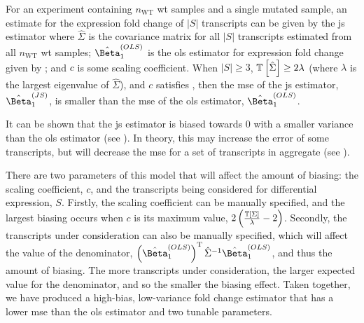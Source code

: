 \begin{theorem}
  For an experiment containing $n_\mathrm{WT}$ \gls{wt} samples and a single mutated sample, an estimate for the expression fold change of $|S|$ transcripts can be given by the \gls{js} estimator  where $\hat{\Sigma}$ is the covariance matrix for all $|S|$ transcripts estimated from all $n_\mathrm{WT}$ \gls{wt} samples; $\fcols$ is the \gls{ols} estimator for expression fold change given by ; and $c$ is some scaling coefficient.
  When $|S| \ge 3$, $\mathbb{T} \left[ \hat{\Sigma} \right] \ge 2\lambda$ (where $\lambda$ is the largest eigenvalue of $\hat{\Sigma}$), and $c$ satisfies , then the \gls{mse} of the \gls{js} estimator, $\fcjs$, is smaller than the \gls{mse} of the \gls{ols} estimator, $\fcols$.
\end{theorem}

It can be shown that the \gls{js} estimator is biased towards 0 with a smaller variance than the \gls{ols} estimator (see ).
In theory, this may increase the error of some transcripts, but will decrease the \gls{mse} for a set of transcripts in aggregate (see ).

There are two parameters of this model that will affect the amount of biasing: the scaling coefficient, $c$, and the transcripts being considered for differential expression, $S$.
Firstly, the scaling coefficient can be manually specified, and the largest biasing occurs when $c$ is its maximum value, $2 \left( \frac{\mathbb{T} \left[ \Sigma \right]}{\lambda} - 2 \right)$.
Secondly, the transcripts under consideration can also be manually specified, which will affect the value of the denominator, $\left( \fcols \right)^\tran \hat{\Sigma}^{-1} \fcols$, and thus the amount of biasing.
The more transcripts under consideration, the larger expected value for the denominator, and so the smaller the biasing effect.
Taken together, we have produced a high-bias, low-variance fold change estimator that has a lower \gls{mse} than the \gls{ols} estimator and two tunable parameters.
